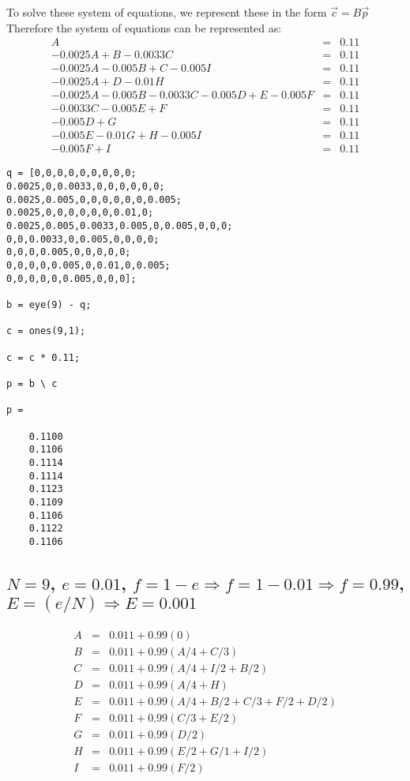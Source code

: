 \documentclass{article}
\begin{document}
To solve these system of equations, we represent these in the form $\vec{c} = B\vec{p}$
Therefore the system of equations can be represented as:
\[
\begin{array}{rcl}A & = & 0.11 \\ -0.0025A + B - 0.0033C & = & 0.11 \\ -0.0025A - 0.005B + C - 0.005I & = & 0.11 \\ -0.0025A + D - 0.01H & = & 0.11 \\ -0.0025A - 0.005B - 0.0033C -0.005D + E - 0.005F & = &0.11 \\ -0.0033C - 0.005E + F & = & 0.11 \\ -0.005D + G & = & 0.11 \\ -0.005E - 0.01G + H - 0.005I & = & 0.11 \\ -0.005F + I & = & 0.11
\end{array}
\]
\begin{lstlisting}
q = [0,0,0,0,0,0,0,0,0;
0.0025,0,0.0033,0,0,0,0,0,0;
0.0025,0.005,0,0,0,0,0,0,0.005;
0.0025,0,0,0,0,0,0,0.01,0;
0.0025,0.005,0.0033,0.005,0,0.005,0,0,0;
0,0,0.0033,0,0.005,0,0,0,0;
0,0,0,0.005,0,0,0,0,0;
0,0,0,0,0.005,0,0.01,0,0.005;
0,0,0,0,0,0.005,0,0,0];

b = eye(9) - q;

c = ones(9,1);

c = c * 0.11;

p = b \ c

p =

    0.1100
    0.1106
    0.1114
    0.1114
    0.1123
    0.1109
    0.1106
    0.1122
    0.1106
\end{lstlisting}

\subsection{$N = 9$, $e = 0.01$, $f = 1 - e \Rightarrow f = 1 - 0.01 \Rightarrow f = 0.99$, $E = (e/N) \Rightarrow E = 0.001$}
\[
\begin{array}{rcl}A & = & 0.011 + 0.99(0)\\ B & = & 0.011 + 0.99(A/4 + C/3) \\ C & = & 0.011 + 0.99(A/4 + I/2 + B/2) \\ D & = & 0.011 + 0.99(A/4 + H) \\ E & = &0.011 + 0.99(A/4+B/2 + C/3 + F/2 + D/2) \\ F & = & 0.011 + 0.99(C/3 + E/2) \\ G & = & 0.011 + 0.99(D/2) \\ H & = & 0.011 + 0.99(E/2 + G/1 + I/2) \\ I & = & 0.011 + 0.99(F/2)
\end{array}
\]
\end{document}
